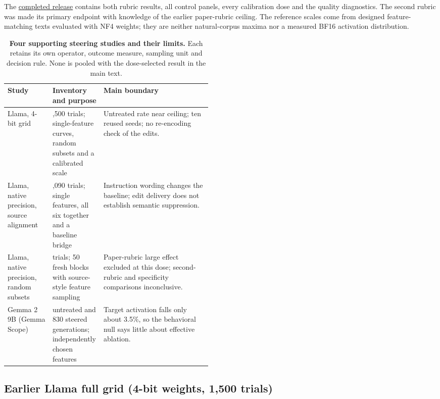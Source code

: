 \documentclass[11pt]{article}
\begin{document}
The
\href{https://github.com/tdj28/llm_selfref_pre/tree/77a4eb55bce97f7ac736ac36099e70a6d5135506/data/berg_dose_exposure_continuation/fixed_main_v1_20261005}{completed release}
contains both rubric results, all control panels, every calibration dose and
the quality diagnostics. The second rubric was made its primary endpoint
with knowledge of the earlier paper-rubric ceiling. The reference scales come
from designed feature-matching texts evaluated with NF4 weights; they are
neither natural-corpus maxima nor a measured BF16 activation distribution.

\begin{table}[tbp]
\centering\small
\caption{\textbf{Four supporting steering studies and their limits.}
Each retains its own operator, outcome measure, sampling unit and decision
rule. None is pooled with the dose-selected result in the main text.}
\label{tab:steering-history}
\begin{tabularx}{\linewidth}{@{}>{\raggedright\arraybackslash}p{0.22\linewidth}>{\raggedright\arraybackslash}p{0.25\linewidth}>{\raggedright\arraybackslash}X@{}}
\toprule
Study & Inventory and purpose & Main boundary\\
\midrule
Llama, 4-bit grid
& 1,500 trials; single-feature curves, random subsets and a calibrated scale
& Untreated rate near ceiling; ten reused seeds; no re-encoding check of the edits.\\
\addlinespace
Llama, native precision, source alignment
& 1,090 trials; single features, all six together and a baseline bridge
& Instruction wording changes the baseline; edit delivery does not establish semantic suppression.\\
\addlinespace
Llama, native precision, random subsets
& 450 trials; 50 fresh blocks with source-style feature sampling
& Paper-rubric large effect excluded at this dose; second-rubric and specificity comparisons inconclusive.\\
\addlinespace
Gemma 2 9B (Gemma Scope)
& 180 untreated and 830 steered generations; independently chosen features
& Target activation falls only about 3.5\%, so the behavioral null says little about effective ablation.\\
\bottomrule
\end{tabularx}
\end{table}
\FloatBarrier


\FloatBarrier

\FloatBarrier

\subsection{Earlier Llama full grid (4-bit weights, 1,500 trials)}
\end{document}
